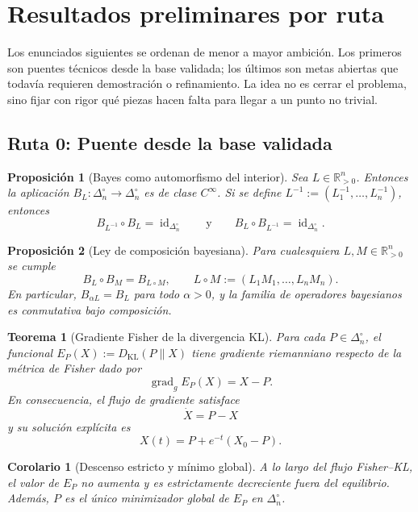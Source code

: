 \documentclass[12pt]{article}
\newtheorem{proposicion}{Proposición}[section]
\newtheorem{teorema}{Teorema}[section]
\newtheorem{corolario}{Corolario}[section]
\begin{document}
\section*{Resultados preliminares por ruta}

Los enunciados siguientes se ordenan de menor a mayor ambición. Los primeros
son puentes técnicos desde la base validada; los últimos son metas abiertas que
todavía requieren demostración o refinamiento. La idea no es cerrar el
problema, sino fijar con rigor qué piezas hacen falta para llegar a un punto no
trivial.

\subsection*{Ruta 0: Puente desde la base validada}

\begin{proposicion}[Bayes como automorfismo del interior]\label{prop:bayes-automorfismo}
Sea $L\in\mathbb R_{>0}^n$. Entonces la aplicación
$B_L:\Delta_n^\circ\to\Delta_n^\circ$ es de clase $C^\infty$. Si se define
$L^{-1}:=(L_1^{-1},\dots,L_n^{-1})$, entonces
\[
B_{L^{-1}}\circ B_L=\operatorname{id}_{\Delta_n^\circ}
\qquad\text{y}\qquad
B_L\circ B_{L^{-1}}=\operatorname{id}_{\Delta_n^\circ}.
\]
\end{proposicion}

\begin{proposicion}[Ley de composición bayesiana]\label{prop:bayes-composicion}
Para cualesquiera $L,M\in\mathbb R_{>0}^n$ se cumple
\[
B_L\circ B_M=B_{L\circ M},
\qquad
L\circ M:=(L_1M_1,\dots,L_nM_n).
\]
En particular, $B_{\alpha L}=B_L$ para todo $\alpha>0$, y la familia de
operadores bayesianos es conmutativa bajo composición.
\end{proposicion}

\begin{teorema}[Gradiente Fisher de la divergencia KL]\label{teo:gradiente-kl}
Para cada $P\in\Delta_n^\circ$, el funcional
$E_P(X):=D_{\mathrm{KL}}(P\|X)$ tiene gradiente riemanniano respecto de la
métrica de Fisher dado por
\[
\operatorname{grad}_g E_P(X)=X-P.
\]
En consecuencia, el flujo de gradiente satisface
\[
\dot X=P-X
\]
y su solución explícita es
\[
X(t)=P+e^{-t}(X_0-P).
\]
\end{teorema}

\begin{corolario}[Descenso estricto y mínimo global]\label{cor:minimo-kl}
A lo largo del flujo Fisher--KL, el valor de $E_P$ no aumenta y es
estrictamente decreciente fuera del equilibrio. Además, $P$ es el único
minimizador global de $E_P$ en $\Delta_n^\circ$.
\end{corolario}
\end{document}
